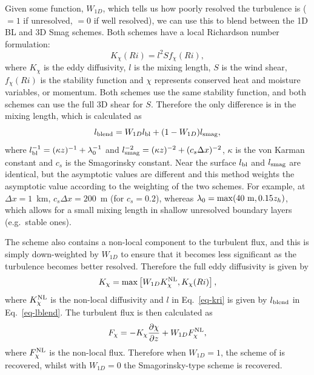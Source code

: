 \documentclass{UMDP_article}
\begin{document}
Given some function, $W_{1D}$, which tells us how poorly resolved the
turbulence is ($=1$ if unresolved, $=0$ if well resolved), we can use
this to blend between the 1D BL and 3D Smag schemes. Both schemes have
a local Richardson number formulation:
\begin{equation}\label{eq-kri}
  K_\chi(Ri) = l^2 S f_\chi(Ri),
\end{equation}
where $K_\chi$ is the eddy diffusivity, $l$ is the mixing length, $S$
is the wind shear, $f_\chi(Ri)$ is the stability function and $\chi$
represents conserved heat and moisture variables, or momentum. Both
schemes use the same stability function, and both schemes can use the
full 3D shear for $S$. Therefore the only difference is in the mixing
length, which is calculated as
\begin{equation}\label{eq-lblend}
  l_{\rm blend} = W_{1D}l_{\rm bl}+(1-W_{1D})l_{\rm smag},
\end{equation}
where $l_{\rm bl}^{-1} = (\kappa z)^{-1} + \lambda_0^{-1}$ and $l_{\rm
  smag}^{-2} = (\kappa z)^{-2} + (c_s \Delta x)^{-2}$, $\kappa$ is the
von Karman constant and $c_s$ is the Smagorinsky constant. Near the
surface $l_{\rm bl}$ and $l_{\rm smag}$ are identical, but the
asymptotic values are different and this method weights the asymptotic
value according to the weighting of the two schemes. For example, at
$\Delta x=1$~km, $c_s\Delta x=200$~m (for $c_s=0.2$), whereas
$\lambda_0=\max(40\ {\rm m}, 0.15z_h)$, which allows for a small
mixing length in shallow unresolved boundary layers (e.g.~stable
ones).

The \cite{lock00} scheme also contains a non-local component to the
turbulent flux, and this is simply down-weighted by $W_{1D}$ to ensure
that it becomes less significant as the turbulence becomes better
resolved. Therefore the full eddy diffusivity is given by
\begin{equation}
  K_\chi = \max\left[W_{1D}K_\chi^{\rm NL}, K_\chi(Ri)\right],
\end{equation}
where $K_\chi^{\rm NL}$ is the non-local diffusivity and $l$ in
Eq.~\ref{eq-kri} is given by $l_{\rm blend}$ in
Eq.~\ref{eq-lblend}. The turbulent flux is then calculated as
\begin{equation}
  F_\chi=-K_\chi\frac{\partial \chi}{\partial z} + W_{1D}F_\chi^{\rm NL},
\end{equation}
where $F_\chi^{\rm NL}$ is the non-local flux. Therefore when
$W_{1D}=1$, the scheme of \cite{lock00} is recovered, whilst with
$W_{1D}=0$ the Smagorinsky-type scheme is recovered.
\end{document}
